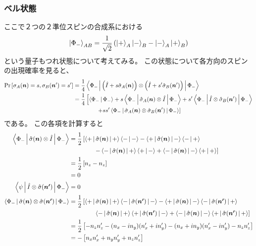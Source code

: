 \documentclass[a4paper, 10pt]{jsarticle}
\begin{document}
\subsubsection{ベル状態}
ここで２つの２準位スピンの合成系における
\begin{align}
	\Ket{\Phi_-}_{AB} = \frac{1}{\sqrt{2}} \left( 
		\Ket{+}_A \Ket{-}_B - \Ket{-}_A \Ket{+}_B
	 \right)
\end{align}
という量子もつれ状態について考えてみる。
この状態について各方向のスピンの出現確率を見ると、
\begin{align}
	\Pr \left[ \sigma_A (\vec{n}) = s, \sigma_B (\vec{n}') = s' \right]
	&= \frac{1}{4} \Braket{\Phi_- |
	\left( \hat{I} + s \hat{\sigma}_A (\vec{n}) \right) \otimes
	\left( \hat{I} + s' \hat{\sigma}_B (\vec{n}') \right) | \Phi_-} \\
	&= \frac{1}{4} \left[ \Braket{\Phi_- | \Phi_-}
	+ s \Braket{\Phi_- | \hat{\sigma}_A (\vec{n}) \otimes \hat{I} | \Phi_-}
	+ s' \Braket{\Phi_- | \hat{I} \otimes \hat{\sigma}_B (\vec{n}') | \Phi_-}
	\right. \\
	&\qquad \qquad \left. + ss' \Braket{\Phi_- |
	\hat{\sigma}_A (\vec{n}) \otimes \hat{\sigma}_B (\vec{n}')
	| \Phi_-} \right]
\end{align}
である。
この各項を計算すると
\begin{align}
	\Braket{\Phi_- | \hat{\sigma} (\vec{n}) \otimes \hat{I} | \Phi_-}
	&= \frac{1}{2}
	\left[ \Braket{+ | \hat{\sigma} (\vec{n}) | +} \Braket{- | -}
	- \Braket{+ | \hat{\sigma} (\vec{n}) | -} \Braket{- | +} \right. \\
	&\qquad \qquad \left.
	- \Braket{- | \hat{\sigma} (\vec{n}) | +} \Braket{+ | -}
	+ \Braket{- | \hat{\sigma} (\vec{n}) | -} \Braket{+ | +} \right] \\
	&= \frac{1}{2} \left[ n_z - n_z \right] \\
	&= 0 \\
	\Braket{\psi | \hat{I} \otimes \hat{\sigma} (\vec{n'}) | \Phi_-}
	&= 0 \\
	\Braket{\Phi_- |
	\hat{\sigma} (\vec{n}) \otimes \hat{\sigma} (\vec{n'}) | \Phi_-}
	&= \frac{1}{2} \left[ \Braket{+ | \hat{\sigma} (\vec{n}) | +}
	\Braket{- | \hat{\sigma} (\vec{n'}) | -}
	- \Braket{+ | \hat{\sigma} (\vec{n}) | -}
	\Braket{- | \hat{\sigma} (\vec{n'}) | +} \right. \\
	&\qquad \qquad \left.
	\Braket{- | \hat{\sigma} (\vec{n}) | +}
	\Braket{+ | \hat{\sigma} (\vec{n'}) | -}
	+ \Braket{- | \hat{\sigma} (\vec{n}) | -}
	\Braket{+ | \hat{\sigma} (\vec{n'}) | +}
	\right] \\
	&= \frac{1}{2} \left[ -n_z n'_z - (n_x - in_y) (n'_x + in'_y)
	- (n_x + in_y) (n'_x - in'_y) - n_z n'_z \right] \\
	&= -\left[ n_x n'_x + n_y n'_y + n_z n'_z \right]
\end{align}
\end{document}
